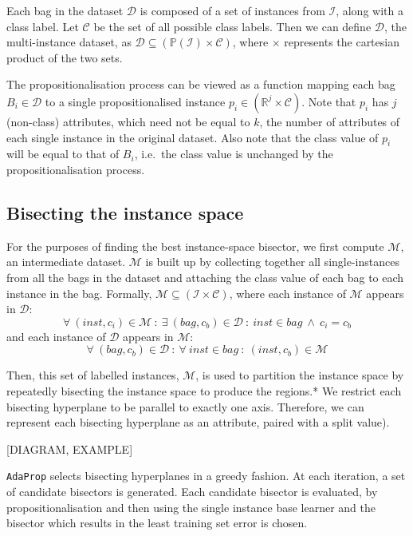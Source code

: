 \documentclass[a4paper,12pt]{article} %
\newcommand{\AdaProp}{\texttt{AdaProp}\xspace}
\newcommand{\real}{\mathbb{R}}
\newcommand{\mcl}[1]{\mathcal{#1}}
\newcommand{\power}{\mathbb{P}}
\begin{document}
Each bag in the dataset $\mcl{D}$ is 
    composed of a set of instances from $\mcl{I}$,
    along with a class label. %
Let $\mcl{C}$ be the set of all possible class labels.
Then we can define $\mcl{D}$,
    the multi-instance dataset, as 
    $\mcl{D} \subseteq ( \power (\mcl{I}) \times \mcl{C} )$,
    where $\times$ represents the cartesian product of the two sets.

The propositionalisation process can be viewed as a function
    mapping each bag $B_i \in \mcl{D}$ to 
    a single propositionalised instance $p_i \in ( \real^j \times \mcl{C} )$.
Note that $p_i$ has $j$ (non-class) attributes, 
    which need not be equal to $k$, the number of attributes of 
    each single instance in the original dataset.
Also note that the class value of $p_i$ will be 
    equal to that of $B_i$,
    i.e.\ the class value is unchanged by the propositionalisation process.
       

\subsection{Bisecting the instance space}

For the purposes of finding the best instance-space bisector,
    we first compute $\mcl{M}$, an intermediate dataset.
$\mcl{M}$ is built up by collecting together all single-instances
    from all the bags in the dataset and 
    attaching the class value of each bag to 
    each instance in the bag.
Formally, $\mcl{M} \subseteq (\mcl{I} \times \mcl{C})$, 
    where each instance of $\mcl{M}$ appears in $\mcl{D}$:
    $$
        \forall~(inst,c_i)\in\mcl{M} ~:~ 
            \exists~(bag,c_b) \in \mcl{D} ~:~ 
                inst \in bag ~\land~ c_i = c_b
    $$
    and each instance of $\mcl{D}$ appears in $\mcl{M}$:
    $$
        \forall~(bag,c_b) \in \mcl{D} ~:~ 
            \forall~inst \in bag ~:~
                (inst,c_b) \in \mcl{M}
    $$    

Then, this set of labelled instances, $\mcl{M}$, is used to partition the instance space by
    repeatedly bisecting the instance space
    to produce the regions.*
We restrict each bisecting hyperplane to be parallel to exactly one axis.
Therefore, we can represent each bisecting hyperplane as an attribute,
    paired with a split value).
    
[DIAGRAM, EXAMPLE]

\AdaProp selects bisecting hyperplanes in a greedy fashion. 
At each iteration, a set of candidate bisectors is generated.
Each candidate bisector is evaluated, 
    by propositionalisation and then using the single instance base learner
    and the bisector which results in the least training set error is chosen.
    
\end{document}
